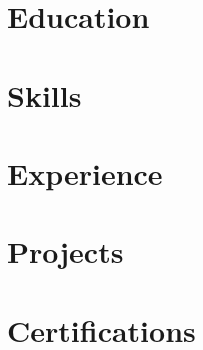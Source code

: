 \documentclass[letter,10pt]{article}
\def\website{vinay-ram1999.github.io}
\begin{document}


\section{Education}


\section{Skills}


\section{Experience}


\section{Projects}


%

%


\section{Certifications}



\end{document}
